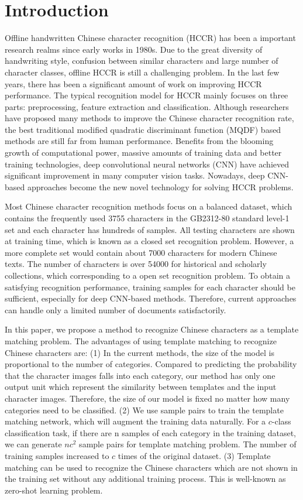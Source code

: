\documentclass[conference]{IEEEtran}
\begin{document}
\section{Introduction}
\label{intro}
Offline handwritten Chinese character recognition (HCCR) has been a important research realms since early works in 1980s\cite{kimura1987modified}. Due to the great diversity of handwriting style, confusion between similar characters and large number of character classes, offline HCCR is still a challenging problem. In the last few years, there has been a significant amount of work on improving HCCR performance. The typical recognition model for HCCR mainly focuses on three parts: preprocessing, feature extraction and classification. Although researchers have proposed many methods to improve the Chinese character recognition rate, the best traditional modified quadratic discriminant function (MQDF) based methods are still far from human performance. Benefits from the blooming growth of computational power, massive amounts of training data and better training technologies, deep convolutional neural networks (CNN)\cite{krizhevsky2012imagenet} have achieved significant improvement in many computer vision tasks. Nowadays, deep CNN-based approaches become the new novel technology for solving HCCR problems.

Most Chinese character recognition methods focus on a balanced dataset, which contains the frequently used 3755 characters in the GB2312-80 standard level-1 set and each character has hundreds of samples. All testing characters are shown at training time, which is known as a closed set recognition problem. However, a more complete set would contain about 7000 characters for modern Chinese texts. The number of characters is over 54000 for historical and scholarly collections, which corresponding to a open set recognition problem. To obtain a satisfying recognition performance, training samples for each character should be sufficient, especially for deep CNN-based methods. Therefore, current approaches can handle only a limited number of documents satisfactorily.          

In this paper, we propose a method to recognize Chinese characters as a template matching problem. The advantages of using template matching to recognize Chinese characters are: (1) In the current methods, the size of the model is proportional to the number of categories. Compared to predicting the probability that the character images falls into each category, our method has only one output unit which represent the similarity between templates and the input character images. Therefore, the size of our model is fixed no matter how many categories need to be classified. (2) We use sample pairs to train the template matching network, which will augment the training data naturally. For a $c$-class classification task, if there are n samples of each category in the training dataset, we can generate $nc^2$ sample pairs for template matching problem. The number of training samples increased to $c$ times of the original dataset. (3) Template matching can be used to recognize the Chinese characters which are not shown in the training set without any additional training process. This is well-known as zero-shot learning problem.
\end{document}
